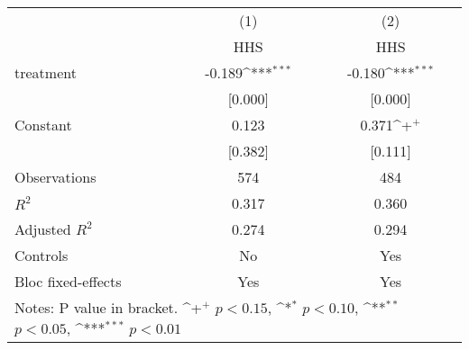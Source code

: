 {
\def\sym#1{\ifmmode^{#1}\else\(^{#1}\)\fi}
\begin{tabular*}{1.2\hsize}{@{\hskip\tabcolsep\extracolsep\fill}l*{2}{c}}
\cline{1-3}\cline{1-3}
     &\multicolumn{1}{c}{(1)}&\multicolumn{1}{c}{(2)}\\
     &\multicolumn{1}{c}{HHS}&\multicolumn{1}{c}{HHS}\\
\cline{1-3}
treatment&-0.189\sym{***}&-0.180\sym{***}\\
     &[0.000]         &[0.000]         \\
[1em]
Constant&0.123         &0.371\sym{+}  \\
     &[0.382]         &[0.111]         \\
\cline{1-3}
Observations&574         &484         \\
\(R^{2}\)&0.317         &0.360         \\
Adjusted \(R^{2}\)&0.274         &0.294         \\
Controls&No         &Yes         \\
Bloc fixed-effects&Yes         &Yes         \\
\cline{1-3}\cline{1-3}
\multicolumn{3}{p{1.0\textwidth}}{\footnotesize Notes: P value in bracket. \sym{+} \(p<0.15\), \sym{*} \(p<0.10\), \sym{**} \(p<0.05\), \sym{***} \(p<0.01\)}\\
\end{tabular*}
}
